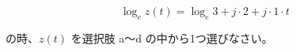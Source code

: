 \[
\log_e z(t) = \log_e 3 + j \cdot 2 + j \cdot 1 \cdot t
\]

\bigskip
\noindent の時、$z(t)$ を選択肢 a〜d の中から1つ選びなさい。
